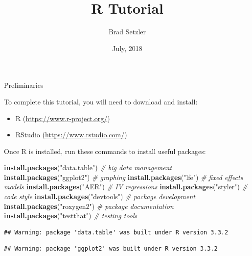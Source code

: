 \documentclass[10pt,ignorenonframetext,]{beamer}
\title{R Tutorial}
\author{Brad Setzler}
\institute{University of Chicago}
\date{July, 2018}
\newenvironment{Shaded}{\begin{snugshade}}{\end{snugshade}}
\newcommand{\KeywordTok}[1]{\textcolor[rgb]{0.13,0.29,0.53}{\textbf{{#1}}}}
\newcommand{\StringTok}[1]{\textcolor[rgb]{0.31,0.60,0.02}{{#1}}}
\newcommand{\CommentTok}[1]{\textcolor[rgb]{0.56,0.35,0.01}{\textit{{#1}}}}
\newcommand{\NormalTok}[1]{{#1}}
\providecommand{\tightlist}{%
\setlength{\itemsep}{0pt}\setlength{\parskip}{0pt}}
\begin{document}
\frame{\titlepage}

\begin{frame}
\tableofcontents[hideallsubsections]
\end{frame}

\begin{frame}

\end{frame}

\begin{frame}[fragile]{Preliminaries}

To complete this tutorial, you will need to download and install:

\begin{itemize}
\tightlist
\item
  R (\url{https://www.r-project.org/})
\item
  RStudio (\url{https://www.rstudio.com/})
\end{itemize}

Once R is installed, run these commands to install useful packages:

\small

\begin{Shaded}
\begin{Highlighting}[]
\KeywordTok{install.packages}\NormalTok{(}\StringTok{"data.table"}\NormalTok{) }\CommentTok{# big data management}
\KeywordTok{install.packages}\NormalTok{(}\StringTok{"ggplot2"}\NormalTok{) }\CommentTok{# graphing}
\KeywordTok{install.packages}\NormalTok{(}\StringTok{"lfe"}\NormalTok{) }\CommentTok{# fixed effects models}
\KeywordTok{install.packages}\NormalTok{(}\StringTok{"AER"}\NormalTok{) }\CommentTok{# IV regressions}
\KeywordTok{install.packages}\NormalTok{(}\StringTok{"styler"}\NormalTok{) }\CommentTok{# code style}
\KeywordTok{install.packages}\NormalTok{(}\StringTok{"devtools"}\NormalTok{) }\CommentTok{# package development}
\KeywordTok{install.packages}\NormalTok{(}\StringTok{"roxygen2"}\NormalTok{) }\CommentTok{# package documentation}
\KeywordTok{install.packages}\NormalTok{(}\StringTok{"testthat"}\NormalTok{) }\CommentTok{# testing tools}
\end{Highlighting}
\end{Shaded}

\normalsize

\small

\begin{verbatim}
## Warning: package 'data.table' was built under R version 3.3.2
\end{verbatim}

\begin{verbatim}
## Warning: package 'ggplot2' was built under R version 3.3.2
\end{verbatim}

\normalsize

\end{frame}
\end{document}
